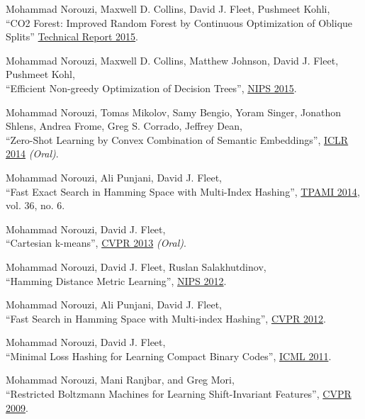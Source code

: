 \documentclass[10pt,letterpaper]{article}
\renewenvironment{itemize}{
  \begin{list}{}{
    \setlength{\leftmargin}{1.5em}
  }
}{
  \end{list}
}
\begin{document}
\begin{itemize}
\item
Mohammad Norouzi, Maxwell D. Collins, David J. Fleet, Pushmeet Kohli,\\
``CO2 Forest: Improved Random Forest by Continuous Optimization of Oblique Splits''
\href{https://arxiv.org/pdf/1506.06155}%
{Technical Report 2015}.

\item
Mohammad Norouzi, Maxwell D. Collins, Matthew Johnson, David J. Fleet, Pushmeet Kohl,\\
``Efficient Non-greedy Optimization of Decision Trees'',
\href{http://arxiv.org/pdf/1511.04056}{NIPS 2015}.

\item
Mohammad Norouzi, Tomas Mikolov, Samy Bengio, Yoram Singer, Jonathon Shlens, Andrea Frome, Greg S. Corrado, Jeffrey Dean,\\
``Zero-Shot Learning by Convex Combination of Semantic Embeddings'',
\href{http://arxiv.org/pdf/1312.5650}{ICLR 2014} {\em (Oral)}.

\item
  Mohammad Norouzi, Ali Punjani, David J. Fleet,\\
  ``Fast Exact Search in Hamming Space with Multi-Index Hashing'',
\href{https://arxiv.org/pdf/1307.2982}%
{TPAMI 2014}, vol. 36, no. 6.

\item
  Mohammad Norouzi, David J. Fleet,\\
  ``Cartesian k-means'',
\href{https://norouzi.github.io/research/papers/ckmeans.pdf}{CVPR 2013} {\em (Oral)}.


\item
  Mohammad Norouzi, David J. Fleet, Ruslan Salakhutdinov,\\
  ``Hamming Distance Metric Learning'',
  \href{https://norouzi.github.io/research/papers/hdml.pdf}{NIPS 2012}.

\item
  Mohammad Norouzi, Ali Punjani, David J. Fleet,\\
  ``Fast Search in Hamming Space with Multi-index Hashing'',
  \href{https://norouzi.github.io/research/papers/multi_index_hashing.pdf}{CVPR 2012}.

\item 
  Mohammad Norouzi, David J. Fleet,\\ ``Minimal Loss Hashing for Learning Compact Binary Codes'',
  \href{https://norouzi.github.io/research/papers/min_loss_hash.pdf}{ICML 2011}.

\item 
  Mohammad Norouzi, Mani Ranjbar, and Greg Mori,\\ ``Restricted Boltzmann Machines for Learning Shift-Invariant Features'',
  \href{https://norouzi.github.io/research/papers/conv_rbm.pdf}{CVPR 2009}.
\end{itemize}
\end{document}
